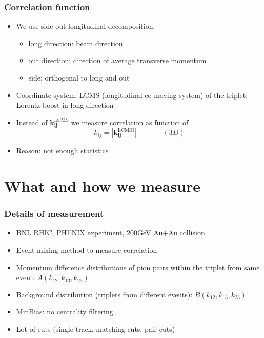 \documentclass{beamer}
\begin{document}
\begin{frame}
\frametitle{Correlation function}
\begin{itemize}
\setlength{\itemsep}{14pt}
\item We use side-out-longitudinal decomposition:
\begin{itemize}
\setlength{\itemsep}{6pt}
\item long direction: beam direction
\item out direction: direction of average transverse momentum
\item side: orthogonal to long and out
\end{itemize}
\item Coordinate system: LCMS (longitudinal co-moving system) of the triplet: Lorentz boost in long direction
\item Instead of $\bm{k_{ij}^{\mathrm{LCMS}}}$ we measure correlation as function of 
\begin{equation*}
k_{ij}=|\bm{k_{ij}^{\mathrm{LCMS3}}}|\;\;\;\;\;\;\;\;\;\;\;\;\;(3D)
\end{equation*}
\item Reason: not enough statistics
\end{itemize}
\end{frame}

\section{What and how we measure}
\begin{frame}
\frametitle{Details of measurement}
\begin{itemize}
\setlength{\itemsep}{22pt}
\item BNL RHIC, PHENIX experiment, 200GeV Au+Au collision
\item Event-mixing method to measure correlation
\item Momentum difference distributions of pion pairs within the triplet from same event: $A(k_{12}, k_{13}, k_{23})$
\item Background distribution (triplets from different events): $B(k_{12}, k_{13}, k_{23})$
\item MinBias: no centrality filtering
\item Lot of cuts (single track, matching cuts, pair cuts)
\end{itemize}
\end{frame}
\end{document}
